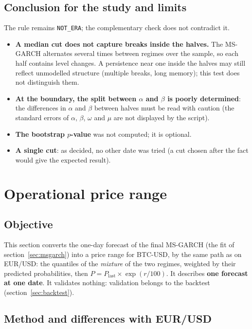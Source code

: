 \documentclass[12pt,a4paper]{article}
\begin{document}
\subsection{Conclusion for the study and limits}

The rule remains \texttt{NOT\_\allowbreak{}ERA}; the complementary check does not contradict it.
\begin{itemize}
	\item \textbf{A median cut does not capture breaks inside the halves.} The MS-GARCH alternates several times between regimes over the sample, so each half contains level changes. A persistence near one inside the halves may still reflect unmodelled structure (multiple breaks, long memory); this test does not distinguish them.
	\item \textbf{At the boundary, the split between $\alpha$ and $\beta$ is poorly determined}: the differences in $\alpha$ and $\beta$ between halves must be read with caution (the standard errors of $\alpha$, $\beta$, $\omega$ and $\mu$ are not displayed by the script).
	\item \textbf{The bootstrap $p$-value} was not computed; it is optional.
	\item \textbf{A single cut}: as decided, no other date was tried (a cut chosen after the fact would give the expected result).
\end{itemize}


\section{Operational price range}
\label{sec:price-range}

\subsection{Objective}

This section converts the one-day forecast of the final MS-GARCH (the fit of section~\ref{sec:msgarch}) into a price range for BTC-USD, by the same path as on EUR/USD: the quantiles of the \emph{mixture} of the two regimes, weighted by their predicted probabilities, then $P = P_{\text{last}}\times \exp(r/100)$. It describes \textbf{one forecast at one date}. It validates nothing: validation belongs to the backtest (section~\ref{sec:backtest}).

\subsection{Method and differences with EUR/USD}
\end{document}
